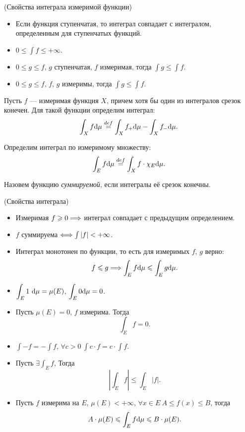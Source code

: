 \begin{theorem}(Свойства интеграла измеримой функции)
	\enewline

	\begin{itemize}
		\item Если функция ступенчатая, то интеграл совпадает с интегралом, определенным
			для ступенчатых функций.
		\item $0 \leqslant \int{f} \leqslant +\infty$.
		\item $0 \leqslant g \leqslant f$, $g$ ступенчатая, $f$ измеримая, тогда
			$\int{g} \leqslant \int{f}$.
		\item $0 \leqslant g \leqslant f$, $f$, $g$ измеримы, тогда $\int{g} \leqslant \int{f}$.
	\end{itemize}
\end{theorem}

\begin{definition}
	Пусть $f$ --- измеримая функция $X$, причем хотя бы один из интегралов срезок конечен.
	Для такой функции определим интеграл:
\[
	\int_X{f \mathrm{d}\mu} \overset{def}{\underset{}{=}} \int_X{f_+ \mathrm{d}\mu} - \int_X{f_- \mathrm{d}\mu}
.\]
\end{definition}

\begin{definition}
	Определим интеграл по измеримому множеству:
\[
	\int_E{f \mathrm{d}\mu} \overset{def}{\underset{}{=}} \int_X{f \cdot \chi_{E} \mathrm{d}\mu}
.\]
\end{definition}

\begin{definition}
	Назовем функцию \textit{суммируемой}, если интегралы её срезок конечны.
\end{definition}

\begin{theorem}(Свойства интеграла)
	\enewline

	\begin{itemize}
		\item Измеримая $f \geqslant 0 \Longrightarrow$ интеграл совпадает с предыдущим определением.
		\item $f$ суммируема $\Longleftrightarrow \int{|f|} < +\infty$. 
        \item Интеграл монотонен по функции, то есть для измеримых $f$, $g$ верно:
\[
    f \leqslant g \Longrightarrow \int_{E}{f \mathrm{d}\mu} \leqslant \int_{E}{g \mathrm{d}\mu}
.\] 
        \item $\displaystyle \int_E{1 ~\mathrm{d}\mu} = \mu(E)$, $\displaystyle \int_E{0 \mathrm{d}\mu} = 0$.
        \item Пусть $\mu(E) = 0$, $f$ измерима. Тогда
\[
    \int_E{f} = 0
.\] 
        \item $\displaystyle \int{-f} = -\int{f}$, $\displaystyle 
               \forall c > 0~ \int{c \cdot f} = c \cdot \int{f}$.
        \item Пусть $\displaystyle \exists \int_E{f}$, Тогда
\[
    \left|{\int_E{f}}\right| \leqslant {\int_E{|f|}}
.\] 
        \item Пусть $f$ измерима на $E$, $\mu(E) < +\infty$, 
            $\forall x \in E~ A \leqslant f(x) \leqslant B$,
            тогда
\[
    A \cdot \mu(E) \leqslant \int_E{f \mathrm{d}\mu} \leqslant B \cdot \mu(E)
.\] 
	\end{itemize}
\end{theorem}

